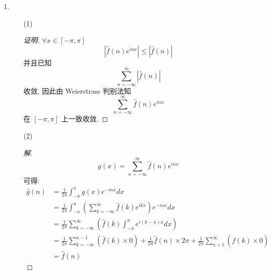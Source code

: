 \documentclass{article}
\begin{document}
\begin{enumerate}
\begin{proof}[证明]
\begin{equation}
\begin{aligned}
                &=\frac{\pi}{2}+\sum_{n\geq1}\frac{2}{\pi n^2}(\cos n\pi-1)\cos nx \\
            \end{aligned}
        \end{equation}
    \end{proof}
    \item \begin{enumerate}
        \item[(1)] \begin{proof}[证明]
        $\forall x\in[-\pi,\pi]$
            \begin{equation}
                \left|\hat{f}(n)e^{inx}\right|\leq\left|\hat{f}(n)\right|
            \end{equation}
            并且已知
            \begin{equation}
                \sum_{n=-\infty}^{\infty}\left|\hat{f}(n)\right|
            \end{equation}
            收敛, 因此由 Weierstrass 判别法知
            \begin{equation}
                \sum_{n=-\infty}^{\infty}\hat{f}(n)e^{inx}
            \end{equation}
            在 $[-\pi,\pi]$ 上一致收敛.
        \end{proof}
        \item[(2)] \begin{proof}[解]
            \begin{equation}
                g(x)=\sum_{n=-\infty}^{\infty}\hat{f}(n)e^{inx}
            \end{equation}
            可得:
            \begin{equation}
                \begin{aligned}
                    \hat{g}(n)
                    &=\frac{1}{2\pi}\int_{-\pi}^{\pi}g(x)e^{-inx}dx \\
                    &=\frac{1}{2\pi}\int_{-\pi}^{\pi}(\sum_{k=-\infty}^{\infty}\hat{f}(k)e^{ikx})e^{-inx}dx \\
                    &=\frac{1}{2\pi}\sum_{k=-\infty}^{\infty}(\hat{f}(k)\int_{-\pi}^{\pi}e^{i(k-n)x}dx) \\
                    &=\frac{1}{2\pi}\sum_{k=-\infty}^{n-1}(\hat{f}(k)\times0)+\frac{1}{2\pi}\hat{f}(n)\times2\pi+\frac{1}{2\pi}\sum_{n+1}^{\infty}(\hat{f}(k)\times0) \\
                    &=\hat{f}(n)
                \end{aligned}
            \end{equation}

\end{proof}
\end{enumerate}
\end{enumerate}
\end{document}
